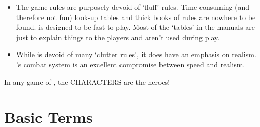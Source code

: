 \documentclass[twoside]{book}
\begin{document}
\begin{itemize}
            
  \item   
               
    {  
     The game rules are purposely devoid of
                `fluff' rules. Time-consuming (and therefore
                not fun) look-up tables and thick books of rules are
                nowhere to be found. \APATHY{}  is designed to be fast
                to play. Most of the `tables' in the \APATHY{}  manuals are just to explain things to the players and
                aren't used during play.
              
    }
    
            
  \item   
               
    {  
     While \APATHY{}  is devoid of many `clutter
                rules', it does have an emphasis on realism.
                \APATHY{}'s combat system is an excellent
                compromise between speed and realism.
              
    }
    
            
\end{itemize}
  
    {  
     In any game of \APATHY{}, the CHARACTERS are the
            heroes!
          
    }
  
    

\section{Basic Terms}
    
\end{document}
